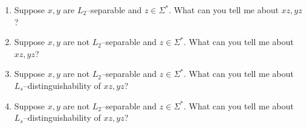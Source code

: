   \mbox{}
  \begin{enumerate}[label=\textnormal{(\alph*)},itemsep=0pt,nosep,noitemsep,partopsep=0pt,topsep=0pt,parsep=0pt]
  \item
    Suppose $x,y$ are $L_2$--separable and $z \in \Sigma^*$.
    What can you tell me about $xz,yz$?
  \item
    Suppose $x,y$ are not $L_2$--separable and $z \in \Sigma^*$.
    What can you tell me about $xz,yz$?
  \item
    Suppose $x,y$ are not $L_2$--separable and $z \in \Sigma^*$.
    What can you tell me about $L_s$--distinguishability of $xz,yz$?
  \item
    Suppose $x,y$ are not $L_2$--separable and $z \in \Sigma^*$.
    What can you tell me about $L_s$--distinguishability of $xz,yz$?
  \end{enumerate}
